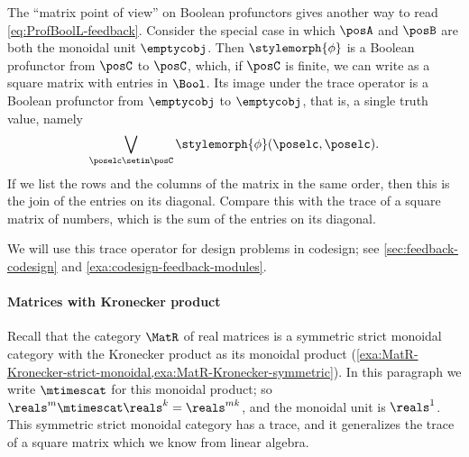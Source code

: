 The ``matrix point of view'' on Boolean profunctors gives another way to read \cref{eq:ProfBoolL-feedback}.
Consider the special case in which $\posA$ and $\posB$ are both the monoidal unit $\emptycobj$.
Then $\stylemorph{\phi}$ is a Boolean profunctor from $\posC$ to $\posC$, which, if $\posC$ is finite, we can write as a square matrix with entries in $\Bool$.
Its image under the trace operator is a Boolean profunctor from $\emptycobj$ to $\emptycobj$, that is, a single truth value, namely
\begin{equation}
    \bigvee_{\poselc \setin \posC} \stylemorph{\phi}(\poselc, \poselc).
\end{equation}
If we list the rows and the columns of the matrix in the same order, then this is the join of the entries on its diagonal.
Compare this with the trace of a square matrix of numbers, which is the sum of the entries on its diagonal.

We will use this trace operator for design problems in codesign; see \cref{sec:feedback-codesign} and \cref{exa:codesign-feedback-modules}.

\paragraph{Matrices with Kronecker product}
\label{sec:trace-MatR-Kronecker}

Recall that the category $\MatR$ of real matrices is a symmetric strict monoidal category with the Kronecker product as its monoidal product (\cref{exa:MatR-Kronecker-strict-monoidal,exa:MatR-Kronecker-symmetric}).
In this paragraph we write $\mtimescat$ for this monoidal product; so $\reals^m \mtimescat \reals^k = \reals^{mk}$, and the monoidal unit is $\reals^1$.
This symmetric strict monoidal category has a trace, and it generalizes the trace of a square matrix which we know from linear algebra.

